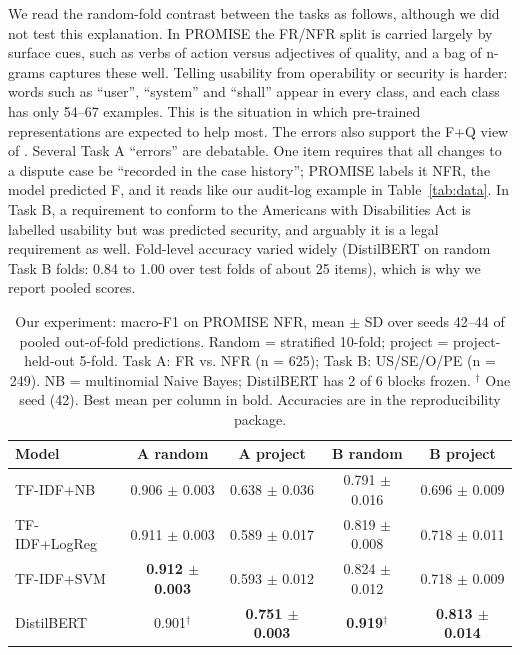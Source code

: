 \documentclass[conference,10pt,letterpaper]{IEEEtran}
\begin{document}
We read the random-fold contrast between the tasks as follows, although we did not test this explanation. In PROMISE the FR/NFR split is carried largely by surface cues, such as verbs of action versus adjectives of quality, and a bag of n-grams captures these well. Telling usability from operability or security is harder: words such as “user”, “system” and “shall” appear in every class, and each class has only 54–67 examples. This is the situation in which pre-trained representations are expected to help most. The errors also support the F+Q view of \textcite{dalpiaz2019}. Several Task A “errors” are debatable. One item requires that all changes to a dispute case be “recorded in the case history”; PROMISE labels it NFR, the model predicted F, and it reads like our audit-log example in Table~\ref{tab:data}. In Task B, a requirement to conform to the Americans with Disabilities Act is labelled usability but was predicted security, and arguably it is a legal requirement as well. Fold-level accuracy varied widely (DistilBERT on random Task B folds: 0.84 to 1.00 over test folds of about 25 items), which is why we report pooled scores.

\begin{table}[!t]
\centering
\caption{Our experiment: macro-F1 on PROMISE NFR, mean $\pm$ SD over seeds 42–44 of pooled out-of-fold predictions. Random = stratified 10-fold; project = project-held-out 5-fold. Task A: FR vs. NFR (n = 625); Task B: US/SE/O/PE (n = 249). NB = multinomial Naive Bayes; DistilBERT has 2 of 6 blocks frozen. $^{\dagger}$ One seed (42). Best mean per column in bold. Accuracies are in the reproducibility package.}
\label{tab:res}
\scriptsize
\setlength{\tabcolsep}{3pt}
\renewcommand{\arraystretch}{1.12}
\begin{tabular}{@{}lcccc@{}}
\toprule
\textbf{Model} & \textbf{A random} & \textbf{A project} & \textbf{B random} & \textbf{B project} \\
\midrule
TF-IDF+NB & 0.906 $\pm$ 0.003 & 0.638 $\pm$ 0.036 & 0.791 $\pm$ 0.016 & 0.696 $\pm$ 0.009 \\
TF-IDF+LogReg & 0.911 $\pm$ 0.003 & 0.589 $\pm$ 0.017 & 0.819 $\pm$ 0.008 & 0.718 $\pm$ 0.011 \\
TF-IDF+SVM & \textbf{0.912 $\pm$ 0.003} & 0.593 $\pm$ 0.012 & 0.824 $\pm$ 0.012 & 0.718 $\pm$ 0.009 \\
DistilBERT & 0.901$^{\dagger}$ & \textbf{0.751 $\pm$ 0.003} & \textbf{0.919$^{\dagger}$} & \textbf{0.813 $\pm$ 0.014} \\
\bottomrule
\end{tabular}
\end{table}
\end{document}
